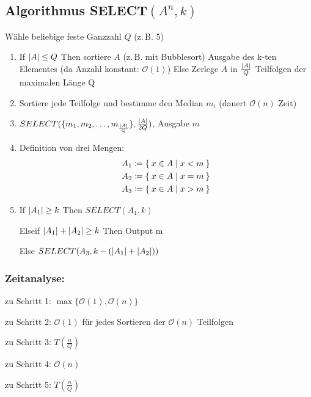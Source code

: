 \documentclass[ngerman,draft,parskip=half*,twoside]{scrreprt}
\theoremstyle{break}
\theoremstyle{nonumberbreak}
\newcommand*{\OO}{\mathcal{O}}      %
\DeclarePairedDelimiter{\abs}{\lvert}{\rvert}
\begin{document}
 \subsection{Algorithmus \texorpdfstring{SELECT$(A^{n},k)$}{SELECT (An,k)}}
 Wähle beliebige feste Ganzzahl $Q$ (z.\,B. 5)
 \begin{enumerate}[Schr{i}tt~1:]
  \item If $\abs{A}\leq Q$ Then sortiere $A$ (z.\,B. mit Bubblesort)
  \hspace{2cm}Ausgabe des k-ten Elementes \hfill(da Anzahl konstant: $\OO(1)$)
  \hspace{1cm}Else Zerlege $A$ in $\frac{\abs{A}}{Q}$ Teilfolgen der maximalen Länge Q
  \item Sortiere jede Teilfolge und bestimme den Median $m_{i}$ \hfill(dauert $\OO(n)$ Zeit)
  \item $SELECT(\{m_{1}, m_{2}, \ldots , m_{\frac{\abs{A}}{Q}}\},\frac{\abs{A}}{2Q})$, Ausgabe $m$
  \item Definition von drei Mengen:
    \begin{align*}
      A_{1}&\coloneqq\Set{x\in A | x<m}\\
    A_{2}&\coloneqq \Set{x\in A | x=m}\\
    A_{3}&\coloneqq \Set{x\in A | x>m}      
    \end{align*}
  \item If $\abs{A_{1}}\geq k$ Then $SELECT (A_{1},k)$

  \hspace{1cm}Elseif $\abs{A_{1}}+\abs{A_{2}}\geq k$ Then Output m

  \hspace{1cm}Else $SELECT (A_{3},k-(\abs{A_{1}}+\abs{A_{2}}))$
 \end{enumerate}
 
 \subsubsection{Zeitanalyse:}
 \hspace{4mm}zu Schritt 1: $\max\{\OO(1),\OO(n)\}$

 zu Schritt 2: $\OO(1)$ für jedes Sortieren der $\OO(n)$ Teilfolgen

 zu Schritt 3: $T(\frac{n}{Q})$

 zu Schritt 4: $\OO(n)$

 zu Schritt 5: $T(\frac{n}{Q})$
 
\end{document}
